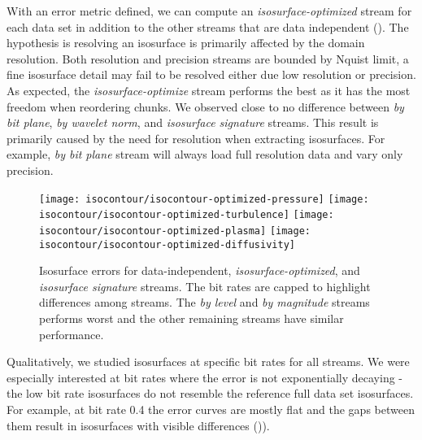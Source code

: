 With an error metric defined, we can compute an \emph{isosurface-optimized} stream for each data set
in addition to the other streams that are data independent (). The
hypothesis is resolving an isosurface is primarily affected by the domain resolution. Both
resolution and precision streams are bounded by Nquist limit, a fine isosurface detail may fail to
be resolved either due low resolution or precision. As expected, the {\em isosurface-optimize}
stream performs the best as it has the most freedom when reordering chunks. We observed close to no
difference between {\em by bit plane}, {\em by wavelet norm}, and {\em isosurface signature}
streams. This result is primarily caused by the need for resolution when extracting isosurfaces. For
example, {\em by bit plane} stream will always load full resolution data and vary only precision.

\begin{figure}[t]
	\centering
	{\texttt{[image: isocontour/isocontour-optimized-pressure]}}
	{\texttt{[image: isocontour/isocontour-optimized-turbulence]}}
	{\texttt{[image: isocontour/isocontour-optimized-plasma]}}
	{\texttt{[image: isocontour/isocontour-optimized-diffusivity]}}
	\caption{Isosurface errors for data-independent, \emph{isosurface-optimized}, and {\em isosurface
	signature} streams. The bit rates are capped to highlight differences among streams. The {\em by
	level} and {\em by magnitude} streams performs worst and the other remaining streams have similar
	performance.}\label{fig:isocontour-plots}
\end{figure}

Qualitatively, we studied isosurfaces at specific bit rates for all streams. We were especially
interested at bit rates where the error is not exponentially decaying - the low bit rate isosurfaces
do not resemble the reference full data set isosurfaces. For example, at bit rate 0.4 the error
curves are mostly flat and the gaps between them result in isosurfaces with visible differences
()).


